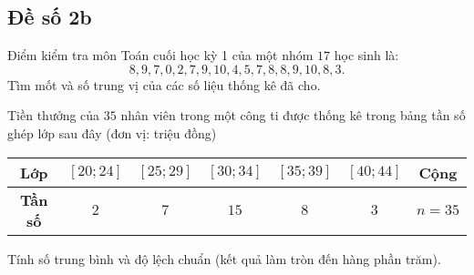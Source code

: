 \subsection{Đề số 2b}
\setcounter{bt}{0}
\begin{bt}%
	Điểm kiểm tra môn Toán cuối học kỳ 1 của một nhóm $17$ học sinh là: $$8, 9, 7, 0, 2, 7, 9, 10, 4, 5, 7, 8, 8, 9, 10, 8, 3.$$
	Tìm mốt và số trung vị của các số liệu thống kê đã cho.
\end{bt}
\begin{bt}%
	Tiền thưởng của $35$ nhân viên trong một công ti được thống kê trong bảng tần số ghép lớp sau đây (đơn vị: triệu đồng)
	\begin{center}
		\begin{tabular}{|c|c|c|c|c|c|c|}
			\hline 
			\bf Lớp &$[20;24]$ &$[25;29]$&$[30;34]$&$[35;39]$&$[40;44]$& Cộng\\ 
			\hline
			\bf Tần số &$2$&$7$&$15$&$8$&$3$&$n=35$\\
			\hline
		\end{tabular}
	\end{center}
	Tính số trung bình và độ lệch chuẩn (kết quả làm tròn đến hàng phần trăm).
\end{bt}
